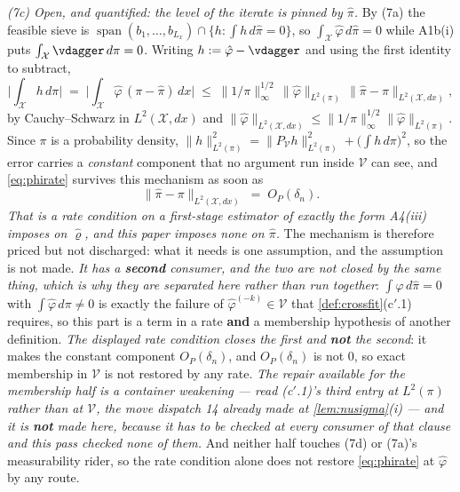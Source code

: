 \begin{remark}
\emph{(7c) Open, and quantified: the level of the iterate is pinned by $\hat\pi$.} By \textup{(7a)} the
feasible sieve is $\operatorname{span}(b_1,\dots,b_{L_x})\cap\{h:\int h\,d\hat\pi=0\}$, so
$\int_{\mathcal X}\hat\varphi\,d\hat\pi=0$ while A1b(i) puts
$\int_{\mathcal X}\vdagger\,d\pi=0$. Writing $h:=\hat\varphi-\vdagger$ and using the first identity to
subtract,
\[
\Big|\int_{\mathcal X}h\,d\pi\Big|
\;=\;\Big|\int_{\mathcal X}\hat\varphi\,(\pi-\hat\pi)\,dx\Big|
\;\le\;\|1/\pi\|^{1/2}_\infty\,\big\|\hat\varphi\big\|_{L^{2}(\pi)}\,
\big\|\hat\pi-\pi\big\|_{L^{2}(\mathcal X,dx)} ,
\]
by Cauchy--Schwarz in $L^{2}(\mathcal X,dx)$ and
$\|\hat\varphi\|_{L^{2}(\mathcal X,dx)}\le\|1/\pi\|^{1/2}_\infty\|\hat\varphi\|_{L^{2}(\pi)}$.
Since $\pi$ is a probability density, $\|h\|^{2}_{L^{2}(\pi)}=\|P_{\mathcal V}h\|^{2}_{L^{2}(\pi)}
+\big(\int h\,d\pi\big)^{2}$, so the error carries a \emph{constant} component that no argument run
inside $\mathcal V$ can see, and \eqref{eq:phirate} survives this mechanism as soon as
\[
\big\|\hat\pi-\pi\big\|_{L^{2}(\mathcal X,dx)}\;=\;O_P(\delta_n) .
\]
\emph{That is a rate condition on a first-stage estimator of exactly the form A4(iii) imposes on
$\hat\varrho$, and this paper imposes none on $\hat\pi$.} The mechanism is therefore priced but not
discharged: what it needs is one assumption, and the assumption is not made.
\emph{It has a \textbf{second} consumer, and the two are not closed by the same thing, which is why they
are separated here rather than run together}: $\int\hat\varphi\,d\hat\pi=0$ with
$\int\hat\varphi\,d\pi\ne0$ is exactly the failure of $\hat\varphi^{(-k)}\in\mathcal V$ that
\cref{def:crossfit}\textup{(c$'$.1)} requires, so this part is a term in a rate \textbf{and} a membership
hypothesis of another definition. \emph{The displayed rate condition closes the first and \textbf{not}
the second}: it makes the constant component $O_P(\delta_n)$, and $O_P(\delta_n)$ is not $0$, so exact
membership in $\mathcal V$ is not restored by any rate. \emph{The repair available for the membership
half is a container weakening --- read \textup{(c$'$.1)}'s third entry at $L^{2}(\pi)$ rather than at
$\mathcal V$, the move dispatch 14 already made at \cref{lem:nusigma}\textup{(i)} --- and it is
\textbf{not} made here, because it has to be checked at every consumer of that clause and this pass
checked none of them.} And neither half touches \textup{(7d)} or \textup{(7a)}'s measurability rider, so
the rate condition alone does not restore \eqref{eq:phirate} at $\hat\varphi$ by any route.


\end{remark}

